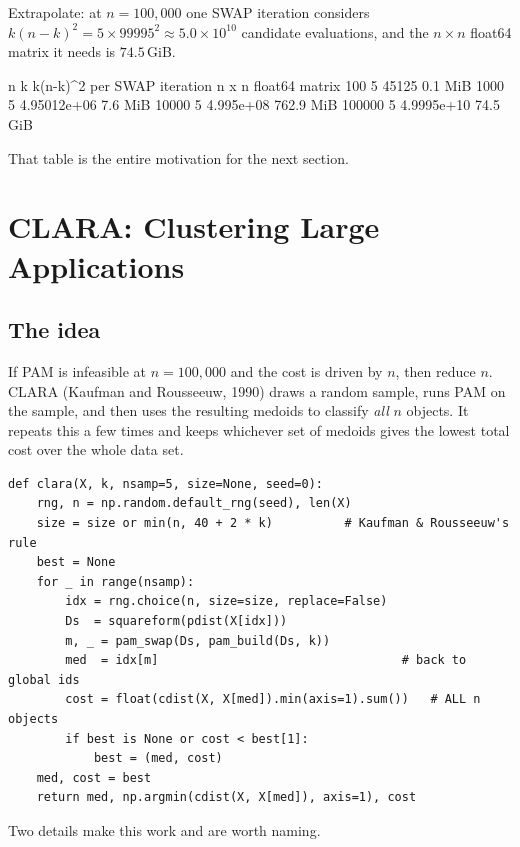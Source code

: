 \documentclass[11pt]{article}
\begin{document}
Extrapolate: at $n = 100{,}000$ one SWAP
iteration considers $k(n-k)^2 = 5 \times 99995^2 \approx 5.0 \times 10^{10}$
candidate evaluations, and the $n \times n$ float64 matrix it needs is
$74.5$\,GiB.

\begin{codeout}
     n     k   k(n-k)^2 per SWAP iteration   n x n float64 matrix
      100   5                      45125              0.1 MiB
     1000   5                4.95012e+06              7.6 MiB
    10000   5                  4.995e+08            762.9 MiB
   100000   5                 4.9995e+10             74.5 GiB
\end{codeout}

That table is the entire motivation for the next section.

\section{CLARA: Clustering Large Applications}
\label{sec:clara}

\subsection{The idea}

If PAM is infeasible at $n = 100{,}000$ and the cost is driven by $n$, then
reduce $n$. CLARA (Kaufman and Rousseeuw, 1990) draws a random sample, runs
PAM on the sample, and then uses the resulting medoids to classify
\emph{all} $n$ objects. It repeats this a few times and keeps whichever set of
medoids gives the lowest total cost over the whole data set.

\begin{lstlisting}
def clara(X, k, nsamp=5, size=None, seed=0):
    rng, n = np.random.default_rng(seed), len(X)
    size = size or min(n, 40 + 2 * k)          # Kaufman & Rousseeuw's rule
    best = None
    for _ in range(nsamp):
        idx = rng.choice(n, size=size, replace=False)
        Ds  = squareform(pdist(X[idx]))
        m, _ = pam_swap(Ds, pam_build(Ds, k))
        med  = idx[m]                                  # back to global ids
        cost = float(cdist(X, X[med]).min(axis=1).sum())   # ALL n objects
        if best is None or cost < best[1]:
            best = (med, cost)
    med, cost = best
    return med, np.argmin(cdist(X, X[med]), axis=1), cost
\end{lstlisting}

Two details make this work and are worth naming.
\end{document}
